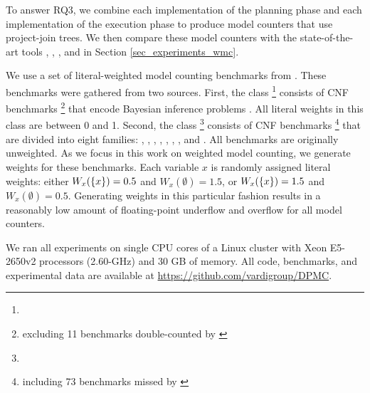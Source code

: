 To answer RQ3, we combine each implementation of the planning phase and each implementation of the execution phase to produce model counters that use project-join trees.
We then compare these model counters with the state-of-the-art tools \cachet{} \cite{sang2004combining}, \ctd{} \cite{darwiche2004new}, \df{} \cite{lagniez2017improved}, and \minictd{} \cite{oztok2015top} in Section \ref{sec_experiments_wmc}.

We use a set of \benchmarkCountAltogether{} literal-weighted model counting benchmarks from \cite{dudek2020addmc}.
These benchmarks were gathered from two sources.
First, the \classBayes{} class%
\footnote{\urlBenchmarksBayes}
consists of \benchmarkCountBayes{} CNF benchmarks%
\footnote{excluding 11 benchmarks double-counted by \cite{dudek2020addmc}}
that encode Bayesian inference problems \cite{sang2005performing}.
All literal weights in this class are between 0 and 1. %
Second, the \classOther{} class%
\footnote{\urlBenchmarksOther}
consists of \benchmarkCountOther{} CNF benchmarks%
\footnote{including 73 benchmarks missed by \cite{dudek2020addmc}}
that are divided into eight families: \famBmc, \famCircuit, \famConfig, \famHandmade, \famPlanning, \famQif, \famRandom, and \famSchedule{} \cite{clarke2001bounded,sinz2003formal,palacios2009compiling,klebanov2013sat}.
All \classOther{} benchmarks are originally unweighted.
As we focus in this work on weighted model counting, we generate weights for these benchmarks.
Each variable $x$ is randomly assigned literal weights: either $W_x(\left\{ x \right\}) = 0.5$ and $W_x(\emptyset) = 1.5$, or $W_x(\left\{ x \right\}) = 1.5$ and $W_x(\emptyset) = 0.5$.
Generating weights in this particular fashion results in a reasonably low amount of floating-point underflow and overflow for all model counters.

We ran all experiments on single CPU cores of a Linux cluster with Xeon E5-2650v2 processors (2.60-GHz) and 30 GB of memory.
All code, benchmarks, and experimental data are available at \url{https://github.com/vardigroup/DPMC}.



